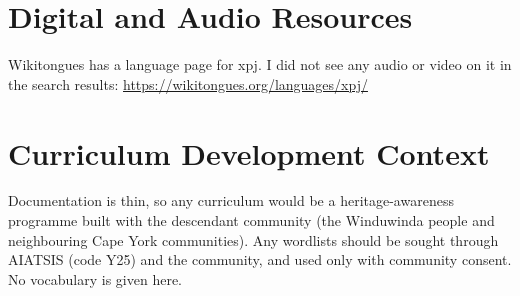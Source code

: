 \documentclass[12pt]{article}
\begin{document}
\section{Digital and Audio Resources}
Wikitongues has a language page for xpj. I did not see any audio or video on it in the search results: \url{https://wikitongues.org/languages/xpj/}

\section{Curriculum Development Context}
Documentation is thin, so any curriculum would be a heritage-awareness programme built with the descendant community (the Winduwinda people and neighbouring Cape York communities). Any wordlists should be sought through AIATSIS (code Y25) and the community, and used only with community consent. No vocabulary is given here.
\end{document}

